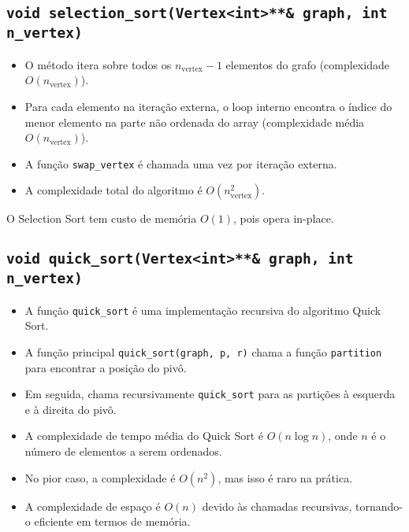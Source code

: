 \documentclass{article}
\begin{document}
\subsection{\texttt{void selection\_sort(Vertex<int>**\& graph, int n\_vertex)}}
\begin{itemize}
    \item O método itera sobre todos os \(n_{\text{vertex}} - 1\) elementos do grafo (complexidade \(O(n_{\text{vertex}})\)).
    \item Para cada elemento na iteração externa, o loop interno encontra o índice do menor elemento na parte não ordenada do array (complexidade média \(O(n_{\text{vertex}})\)).
    \item A função \texttt{swap\_vertex} é chamada uma vez por iteração externa.
    \item A complexidade total do algoritmo é \(O(n_{\text{vertex}}^2)\).
\end{itemize}

O Selection Sort tem custo de memória \(O(1)\), pois opera in-place.


\subsection{\texttt{void quick\_sort(Vertex<int>**\& graph, int n\_vertex)}}
\begin{itemize}
    \item A função \texttt{quick\_sort} é uma implementação recursiva do algoritmo Quick Sort.
    \item A função principal \texttt{quick\_sort(graph, p, r)} chama a função \texttt{partition} para encontrar a posição do pivô.
    \item Em seguida, chama recursivamente \texttt{quick\_sort} para as partições à esquerda e à direita do pivô.
    \item A complexidade de tempo média do Quick Sort é \(O(n \log n)\), onde \(n\) é o número de elementos a serem ordenados.
    \item No pior caso, a complexidade é \(O(n^2)\), mas isso é raro na prática.
    \item A complexidade de espaço é \(O(n)\) devido às chamadas recursivas, tornando-o eficiente em termos de memória.
\end{itemize}


\end{document}
